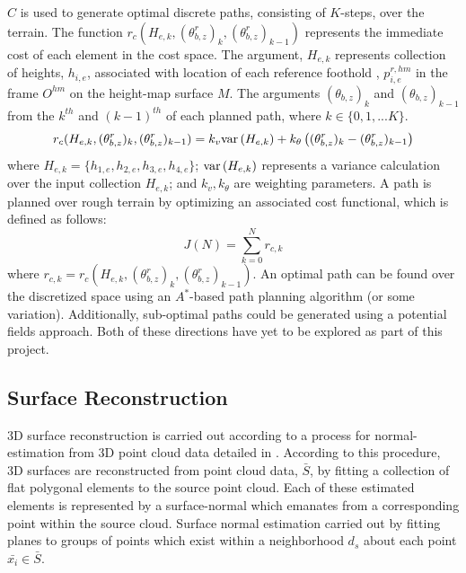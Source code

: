 			$C$ is used to generate optimal discrete paths, consisting of $K$-steps,  over the terrain. The function $r_{c}(H_{e,k},(\theta_{b,z}^{r})_{k},(\theta_{b,z}^{r})_{k-1})$ represents the immediate cost of each element in the cost space. The argument, $H_{e,k}$ represents collection of heights, $h_{i,e}$, associated with location of each \Ith reference foothold , $p_{i,e}^{r,hm}$ in the frame $O^{hm}$ on the height-map surface $M$. The arguments $(\theta_{b,z})_{k}$ and $(\theta_{b,z})_{k-1}$ from the $k^{th}$ and $(k-1)^{th}$ of each planned path, where $k\in \{ 0,1,...K \}$. 
				\begin{equation}
					r_{c}(H_{e,k},(\theta_{b,z}^{r})_{k},(\theta_{b,z}^{r})_{k-1}) = k_{v}\text{var}\left(H_{e,k}\right) + k_{\theta}\left((\theta_{b,z}^{r})_{k}-(\theta_{b,z}^{r})_{k-1}\right)
				\end{equation}
			where $H_{e,k}=\{h_{1,e},h_{2,e},h_{3,e},h_{4,e}\}$; $\text{var}\left(H_{e,k}\right)$ represents a variance calculation over the input collection $H_{e,k}$; and $k_{v},k_{\theta}$ are weighting parameters.
			A path is planned over rough terrain by optimizing an associated cost functional, which is defined as follows:
				\begin{equation}			
					J(N) = \sum_{k=0}^N r_{c,k}
				\end{equation}	
			where  $r_{c,k} = r_{c}(H_{e,k},(\theta_{b,z}^{r})_{k},(\theta_{b,z}^{r})_{k-1})$. An optimal path can be found over the discretized space using an $A^{*}$-based path planning algorithm (or some variation). Additionally, sub-optimal paths could be generated using a potential fields approach. Both of these directions have yet to be explored as part of this project.


		\subsection{Surface Reconstruction}

			3D surface reconstruction is carried out according to a process for normal-estimation from 3D point cloud data detailed in \cite{Rusu2009}. According to this procedure, 3D surfaces are reconstructed from point cloud data, $\bar{S}$, by fitting a collection of flat polygonal elements to the source point cloud. Each of these estimated elements is represented by a surface-normal which emanates from a corresponding point within the source cloud. Surface normal estimation carried out by fitting planes to groups of points which exist within a neighborhood $d_{s}$ about each point $\bar{x_{i}}\in\bar{S}$.

